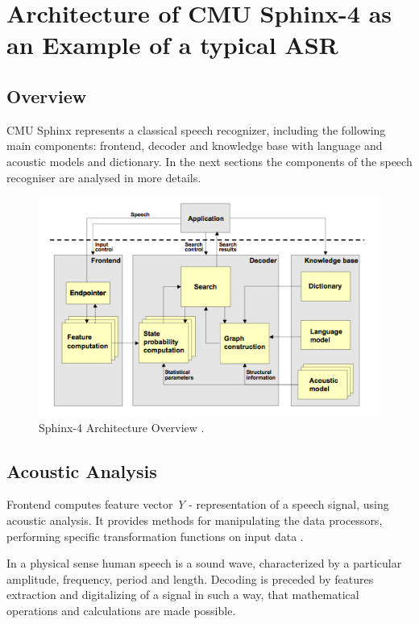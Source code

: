 \chapter{Architecture of CMU Sphinx-4 as an Example of a typical ASR}
\label{ch:sphinx}
 \section {Overview} 
CMU Sphinx represents a classical speech recognizer, including the following
main components: frontend, decoder and knowledge base with language and acoustic
models and dictionary. In the next sections the components of the speech
recogniser are analysed in more details.
 
 \begin{figure}[htbp]
  \centering
    \includegraphics[width=1.0\textwidth]{images/sphinxarch.png}
 \caption{Sphinx-4 Architecture Overview \parencite
 {Lamereetal2013:Eurospeech}.}
  \label{fig:sphinx arh}
\end {figure}

 \section {Acoustic Analysis} 

Frontend computes feature vector \textit {Y } - representation of a speech
signal, using acoustic analysis.  It provides methods for manipulating the data processors, performing
specific transformation functions on input data \parencite{Lamereetal2013:Eurospeech}.

In a physical sense human speech is a sound wave, characterized by a particular amplitude, frequency, period and length.
Decoding is preceded by features extraction and digitalizing of a signal in such a way, that mathematical operations and calculations are made possible. 

